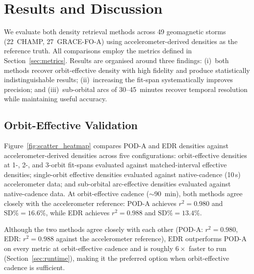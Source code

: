\documentclass[draft]{agujournal2019}
\begin{document}
\section{Results and Discussion}

We evaluate both density retrieval methods across 49 geomagnetic storms
(22~CHAMP, 27~GRACE-FO-A) using accelerometer-derived densities as the
reference truth. All comparisons employ the metrics defined in
Section~\ref{sec:metrics}. Results are organised around three findings:
(i)~both methods recover orbit-effective density with high fidelity and produce
statistically indistinguishable results; (ii)~increasing the fit-span
systematically improves precision; and (iii)~sub-orbital arcs of
30--45~minutes recover temporal resolution while maintaining useful accuracy.

\subsection{Orbit-Effective Validation}
\label{sec:orbit-effective-validation}

Figure~\ref{fig:scatter_heatmap} compares POD-A and EDR densities against
accelerometer-derived densities across five configurations: orbit-effective
densities at 1-, 2-, and 3-orbit fit-spans evaluated against matched-interval
effective densities; single-orbit effective densities evaluated against
native-cadence (10\,s) accelerometer data; and sub-orbital arc-effective
densities evaluated against native-cadence data. At orbit-effective cadence ($\sim$90~min), both
methods agree closely with the accelerometer reference: POD-A achieves
$r^{2} = 0.980$ and $\text{SD\%} = 16.6\%$, while EDR achieves
$r^{2} = 0.988$ and $\text{SD\%} = 13.4\%$.

Although the two methods agree closely with each other (POD-A: $r^{2} = 0.980$, EDR: $r^{2} = 0.988$ against the accelerometer reference), EDR outperforms POD-A on every metric at orbit-effective cadence and is roughly $6\times$ faster to run (Section~\ref{sec:runtime}), making it the preferred option when orbit-effective cadence is sufficient.
\end{document}
